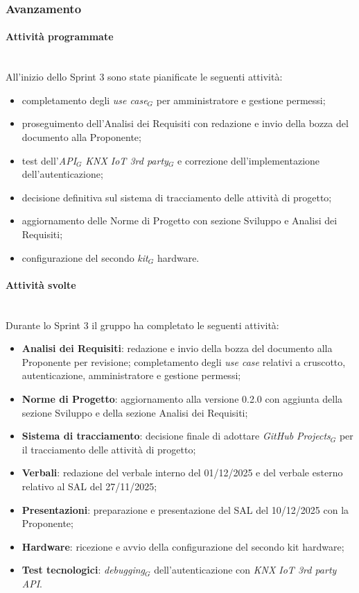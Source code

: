 \documentclass[10pt, letterpaper]{article}
\newcommand{\trisubsection}[1]{\paragraph{#1}\mbox{}\\}
\begin{document}
\subsubsection{Avanzamento}
\trisubsection{Attività programmate}
All'inizio dello Sprint 3 sono state pianificate le seguenti attività:
\begin{itemize}
    \item completamento degli \textit{use case$_G$} per amministratore e gestione permessi;
    \item proseguimento dell'Analisi dei Requisiti con redazione e invio della bozza del documento alla Proponente;
    \item test dell'\textit{API$_G$} \textit{KNX IoT 3rd party$_G$} e correzione dell'implementazione dell'autenticazione;
    \item decisione definitiva sul sistema di tracciamento delle attività di progetto;
    \item aggiornamento delle Norme di Progetto con sezione Sviluppo e Analisi dei Requisiti;
    \item configurazione del secondo \textit{kit$_G$} hardware.
\end{itemize}

\trisubsection{Attività svolte}
Durante lo Sprint 3 il gruppo ha completato le seguenti attività:
\begin{itemize}
    \item \textbf{Analisi dei Requisiti}: redazione e invio della bozza del documento alla Proponente per revisione; completamento degli \textit{use case} relativi a cruscotto, autenticazione, amministratore e gestione permessi;
    \item \textbf{Norme di Progetto}: aggiornamento alla versione 0.2.0 con aggiunta della sezione Sviluppo e della sezione Analisi dei Requisiti;
    \item \textbf{Sistema di tracciamento}: decisione finale di adottare \textit{GitHub Projects$_G$} per il tracciamento delle attività di progetto;
    \item \textbf{Verbali}: redazione del verbale interno del 01/12/2025 e del verbale esterno relativo al SAL del 27/11/2025;
    \item \textbf{Presentazioni}: preparazione e presentazione del SAL del 10/12/2025 con la Proponente;
    \item \textbf{Hardware}: ricezione e avvio della configurazione del secondo kit hardware;
    \item \textbf{Test tecnologici}: \textit{debugging$_G$} dell'autenticazione con \textit{KNX IoT 3rd party API}.
\end{itemize}
\end{document}
